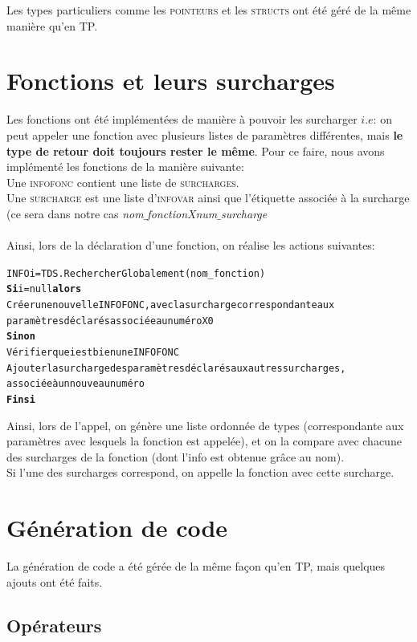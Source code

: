 \documentclass[11pt,a4paper]{report}
\begin{document}
 Les types particuliers comme les \textsc{pointeurs} et les \textsc{structs} ont été géré de la même manière qu'en TP.

\section{Fonctions et leurs surcharges}

Les fonctions ont été implémentées de manière à pouvoir les surcharger $i.e$: on peut appeler une fonction avec plusieurs listes de paramètres différentes, mais {\bf le type de retour doit toujours rester le même}. Pour ce faire, nous avons implémenté les fonctions de la manière suivante: \\
Une \textsc{infofonc} contient une liste de \textsc{surcharges}. \\
Une \textsc{surcharge} est une liste d'\textsc{infovar} ainsi que l'étiquette associée à la surcharge (ce sera dans notre cas \textsl{nom$\_$fonctionXnum$\_$surcharge}  \\\\
Ainsi, lors de la déclaration d'une fonction, on réalise les actions suivantes: 
\begin{alltt}
INFO i = TDS.RechercherGlobalement(nom_fonction)
  {\bf Si} i = null {\bf alors}
      Créer une nouvelle INFOFONC, avec la surcharge correspondante aux 
      paramètres déclarés associée au numéro X0
  {\bf Sinon}
      Vérifier que i est bien une INFOFONC
      Ajouter la surcharge des paramètres déclarés aux autres surcharges,
      associée à un nouveau numéro
  {\bf Fin si} 
\end{alltt}

Ainsi, lors de l'appel, on génère une liste ordonnée de types (correspondante aux paramètres avec lesquels la fonction est appelée), et on la compare avec chacune des surcharges de la fonction (dont l'info est obtenue grâce au nom). \\ 
Si l'une des surcharges correspond, on appelle la fonction avec cette surcharge.

\section{Génération de code}

La génération de code a été gérée de la même façon qu'en TP, mais quelques ajouts ont été faits.

\subsection{Opérateurs}
\end{document}
